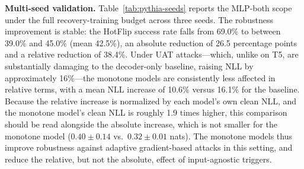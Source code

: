 \documentclass{article}
\theoremstyle{plain}
\theoremstyle{definition}
\theoremstyle{remark}
\begin{document}
\textbf{Multi-seed validation.}
Table~\ref{tab:pythia-seeds} reports the MLP-both scope under the full recovery-training budget across three seeds. The robustness improvement is stable: the HotFlip success rate falls from 69.0\% to between 39.0\% and 45.0\% (mean 42.5\%), an absolute reduction of 26.5 percentage points and a relative reduction of 38.4\%. Under UAT attacks---which, unlike on T5, are substantially damaging to the decoder-only baseline, raising NLL by approximately 16\%---the monotone models are consistently less affected in relative terms, with a mean NLL increase of 10.6\% versus 16.1\% for the baseline. Because the relative increase is normalized by each model's own clean NLL, and the monotone model's clean NLL is roughly 1.9 times higher, this comparison should be read alongside the absolute increase, which is not smaller for the monotone model ($0.40 \pm 0.14$ vs.\ $0.32 \pm 0.01$ nats). The monotone models thus improve robustness against adaptive gradient-based attacks in this setting, and reduce the relative, but not the absolute, effect of input-agnostic triggers.

\begin{table}[t]
\caption{Pythia-1.4B results with the MLP-both constraint scope under the full recovery budget. PPL denotes held-out Pile perplexity; SR denotes HotFlip attack success rate ($n = 200$, 10 flips, 15\% threshold); UAT NLL$\uparrow$ denotes the relative NLL increase under the learned universal trigger (base $\to$ monotone), and UAT $\Delta$NLL the corresponding absolute increase in nats.}
\label{tab:pythia-seeds}
\vskip 0.1in
\centering
{}
\vskip -0.1in
\end{table}
\end{document}
